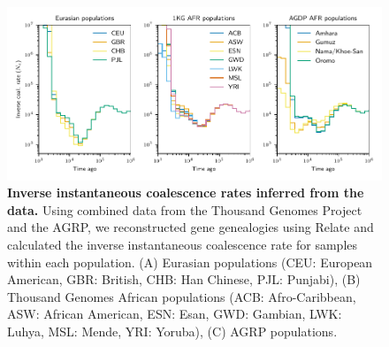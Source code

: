 \documentclass[]{article}
\begin{document}
\begin{figure}[ht]
    \centering
    \includegraphics{figures/supp-relate-iicr-data}
    \caption{
        \textbf{Inverse instantaneous coalescence rates inferred from the data.}
        Using combined data from the Thousand Genomes Project and the AGRP,
        we reconstructed gene genealogies using Relate and calculated the
        inverse instantaneous coalescence rate for samples within each population.
        (A) Eurasian populations (CEU: European American, GBR: British,
        CHB: Han Chinese, PJL: Punjabi), (B) Thousand Genomes African populations
        (ACB: Afro-Caribbean, ASW: African American, ESN: Esan, GWD: Gambian,
        LWK: Luhya, MSL: Mende, YRI: Yoruba), (C) AGRP populations.
    }
    \label{fig:supp-iicr-data}
\end{figure}
\end{document}
